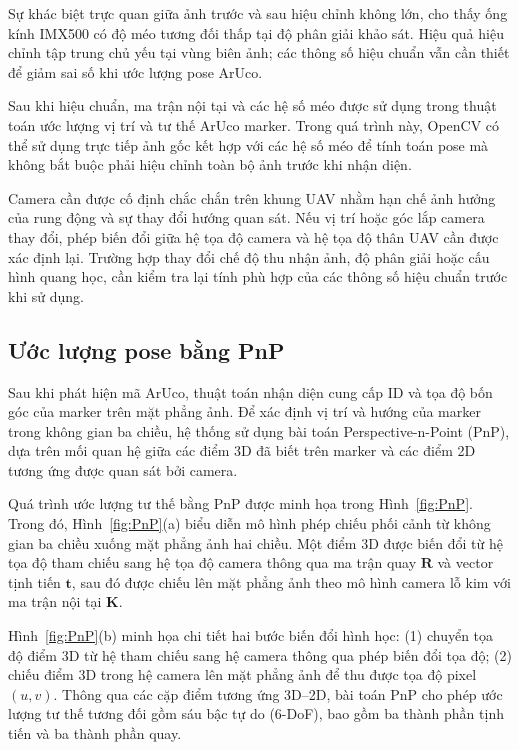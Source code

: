 Sự khác biệt trực quan giữa ảnh trước và sau hiệu chỉnh không lớn, cho thấy ống kính IMX500 có độ méo tương đối thấp tại độ phân giải khảo sát. Hiệu quả hiệu chỉnh tập trung chủ yếu tại vùng biên ảnh; các thông số hiệu chuẩn vẫn cần thiết để giảm sai số khi ước lượng pose ArUco.

Sau khi hiệu chuẩn, ma trận nội tại và các hệ số méo được sử dụng trong thuật toán ước lượng vị trí và tư thế ArUco marker. Trong quá trình này, OpenCV có thể sử dụng trực tiếp ảnh gốc kết hợp với các hệ số méo để tính toán pose mà không bắt buộc phải hiệu chỉnh toàn bộ ảnh trước khi nhận diện.

Camera cần được cố định chắc chắn trên khung UAV nhằm hạn chế ảnh hưởng của rung động và sự thay đổi hướng quan sát. Nếu vị trí hoặc góc lắp camera thay đổi, phép biến đổi giữa hệ tọa độ camera và hệ tọa độ thân UAV cần được xác định lại. Trường hợp thay đổi chế độ thu nhận ảnh, độ phân giải hoặc cấu hình quang học, cần kiểm tra lại tính phù hợp của các thông số hiệu chuẩn trước khi sử dụng.


\subsection{Ước lượng pose bằng PnP}

Sau khi phát hiện mã ArUco, thuật toán nhận diện cung cấp ID
và tọa độ bốn góc của marker trên mặt phẳng ảnh. Để xác định
vị trí và hướng của marker trong không gian ba chiều, hệ
thống sử dụng bài toán Perspective-n-Point (PnP), dựa trên
mối quan hệ giữa các điểm 3D đã biết trên marker và các điểm
2D tương ứng được quan sát bởi camera.

Quá trình ước lượng tư thế bằng PnP được minh họa trong
Hình~\ref{fig:PnP}. Trong đó, Hình~\ref{fig:PnP}(a)
biểu diễn mô hình phép chiếu phối cảnh từ không gian ba chiều
xuống mặt phẳng ảnh hai chiều. Một điểm 3D được biến đổi
từ hệ tọa độ tham chiếu sang hệ tọa độ camera thông qua
ma trận quay $\mathbf{R}$ và vector tịnh tiến $\mathbf{t}$,
sau đó được chiếu lên mặt phẳng ảnh theo mô hình camera
lỗ kim với ma trận nội tại $\mathbf{K}$.

Hình~\ref{fig:PnP}(b) minh họa chi tiết hai bước biến đổi
hình học: (1) chuyển tọa độ điểm 3D từ hệ tham chiếu sang
hệ camera thông qua phép biến đổi tọa độ; (2) chiếu điểm 3D
trong hệ camera lên mặt phẳng ảnh để thu được tọa độ pixel
$(u,v)$. Thông qua các cặp điểm tương ứng 3D--2D, bài toán
PnP cho phép ước lượng tư thế tương đối gồm sáu bậc tự do
(6-DoF), bao gồm ba thành phần tịnh tiến và ba thành phần
quay.

